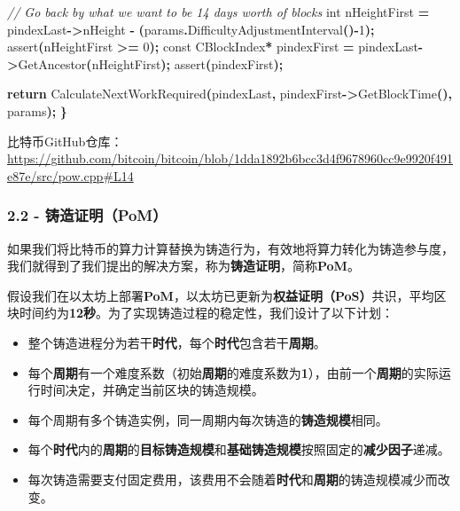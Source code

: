 \documentclass[
]{article}
\newenvironment{Shaded}{\begin{snugshade}}{\end{snugshade}}
\newcommand{\AttributeTok}[1]{\textcolor[rgb]{0.13,0.29,0.53}{#1}}
\newcommand{\CommentTok}[1]{\textcolor[rgb]{0.56,0.35,0.01}{\textit{#1}}}
\newcommand{\ControlFlowTok}[1]{\textcolor[rgb]{0.13,0.29,0.53}{\textbf{#1}}}
\newcommand{\DataTypeTok}[1]{\textcolor[rgb]{0.13,0.29,0.53}{#1}}
\newcommand{\DecValTok}[1]{\textcolor[rgb]{0.00,0.00,0.81}{#1}}
\newcommand{\NormalTok}[1]{#1}
\newcommand{\OperatorTok}[1]{\textcolor[rgb]{0.81,0.36,0.00}{\textbf{#1}}}
\newcommand{\OtherTok}[1]{\textcolor[rgb]{0.56,0.35,0.01}{#1}}
\begin{document}
\begin{Shaded}
\begin{Highlighting}[numbers=left,,]
    \CommentTok{// Go back by what we want to be 14 days worth of blocks}
    \DataTypeTok{int}\NormalTok{ nHeightFirst }\OperatorTok{=}\NormalTok{ pindexLast}\OperatorTok{{-}\textgreater{}}\NormalTok{nHeight }\OperatorTok{{-}} \OperatorTok{(}\NormalTok{params}\OperatorTok{.}\NormalTok{DifficultyAdjustmentInterval}\OperatorTok{(){-}}\DecValTok{1}\OperatorTok{);}
    \OtherTok{assert}\OperatorTok{(}\NormalTok{nHeightFirst }\OperatorTok{\textgreater{}=} \DecValTok{0}\OperatorTok{);}
    \AttributeTok{const}\NormalTok{ CBlockIndex}\OperatorTok{*}\NormalTok{ pindexFirst }\OperatorTok{=}\NormalTok{ pindexLast}\OperatorTok{{-}\textgreater{}}\NormalTok{GetAncestor}\OperatorTok{(}\NormalTok{nHeightFirst}\OperatorTok{);}
    \OtherTok{assert}\OperatorTok{(}\NormalTok{pindexFirst}\OperatorTok{);}

    \ControlFlowTok{return}\NormalTok{ CalculateNextWorkRequired}\OperatorTok{(}\NormalTok{pindexLast}\OperatorTok{,}\NormalTok{ pindexFirst}\OperatorTok{{-}\textgreater{}}\NormalTok{GetBlockTime}\OperatorTok{(),}\NormalTok{ params}\OperatorTok{);}
\OperatorTok{\}}
\end{Highlighting}
\end{Shaded}

比特币GitHub仓库：\url{https://github.com/bitcoin/bitcoin/blob/1dda1892b6bcc3d4f9678960cc9e9920f491e87e/src/pow.cpp\#L14}

\subsubsection{2.2 - 铸造证明（PoM）}\label{ux94f8ux9020ux8bc1ux660epom}

如果我们将比特币的算力计算替换为铸造行为，有效地将算力转化为铸造参与度，我们就得到了我们提出的解决方案，称为\textbf{铸造证明}，简称\textbf{PoM}。

假设我们在以太坊上部署\textbf{PoM}，以太坊已更新为\textbf{权益证明（PoS）}共识，平均区块时间约为\textbf{12秒}。为了实现铸造过程的稳定性，我们设计了以下计划：

\begin{itemize}
\item
  整个铸造进程分为若干\textbf{时代}，每个\textbf{时代}包含若干\textbf{周期}。
\item
  每个\textbf{周期}有一个难度系数（初始\textbf{周期}的难度系数为\textbf{1}），由前一个\textbf{周期}的实际运行时间决定，并确定当前区块的铸造规模。
\item
  每个周期有多个铸造实例，同一周期内每次铸造的\textbf{铸造规模}相同。
\item
  每个\textbf{时代}内的\textbf{周期}的\textbf{目标铸造规模}和\textbf{基础铸造规模}按照固定的\textbf{减少因子}递减。
\item
  每次铸造需要支付固定费用，该费用不会随着\textbf{时代}和\textbf{周期}的铸造规模减少而改变。
\end{itemize}
\end{document}
